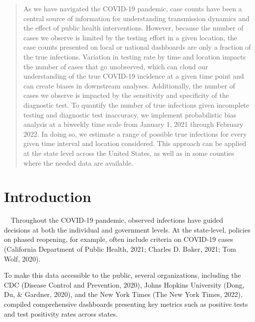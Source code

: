 \documentclass[12pt,twoside]{smiththesis}
\begin{document}
  {
    \hypersetup{linkcolor=black}
    \setcounter{tocdepth}{2}
    \tableofcontents
  }


  \begin{abstract}
    As we have navigated the COVID-19 pandemic, case counts have been a central source of information for understanding transmission dynamics and the effect of public health interventions. However, because the number of cases we observe is limited by the testing effort in a given location, the case counts presented on local or national dashboards are only a fraction of the true infections. Variation in testing rate by time and location impacts the number of cases that go unobserved, which can cloud our understanding of the true COVID-19 incidence at a given time point and can create biases in downstream analyses. Additionally, the number of cases we observe is impacted by the sensitivity and specificity of the diagnostic test. To quantify the number of true infections given incomplete testing and diagnostic test inaccuracy, we implement probabilistic bias analysis at a biweekly time scale from January 1, 2021 through February 2022. In doing so, we estimate a range of possible true infections for every given time interval and location considered. This approach can be applied at the state level across the United States, as well as in some counties where the needed data are available.
  \end{abstract}

\mainmatter %
\pagestyle{fancyplain} %

\hypertarget{introduction}{%
\chapter{Introduction}\label{introduction}}

~~Throughout the COVID-19 pandemic, observed infections have guided decisions at both the individual and government levels. At the state-level, policies on phased reopening, for example, often include criteria on COVID-19 cases (California Department of Public Health, 2021; Charles D. Baker, 2021; Tom Wolf, 2020).

To make this data accessible to the public, several organizations, including the CDC (Disease Control and Prevention, 2020), Johns Hopkins University (Dong, Du, \& Gardner, 2020), and the New York Times (The New York Times, 2022), compiled comprehensive dashboards presenting key metrics such as positive tests and test positivity rates across states.
\end{document}
